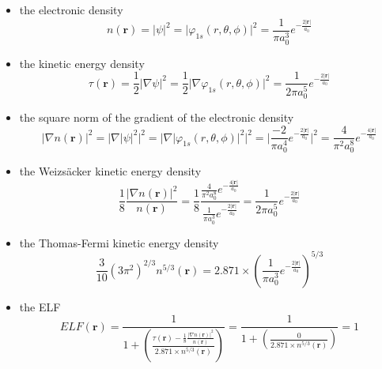 \documentclass[a4paper,12pt]{report}
\begin{document}
\begin{itemize}
\item the electronic density
\begin{equation}
n(\mathbf{r}) = \vert \psi \vert^2 = \vert \varphi_{1s}(r,\theta,\phi) \vert^2 = \frac{1}{\pi a_0^3} e^{-\frac{2\vert \mathbf{r} \vert}{a_0}}
\end{equation}
\item the kinetic energy density
\begin{equation}
\tau(\mathbf{r}) = \frac{1}{2} \vert \nabla \psi \vert^2 = \frac{1}{2} \vert \nabla \varphi_{1s}(r,\theta,\phi) \vert^2 = \frac{1}{2\pi a_0^5} e^{-\frac{2\vert \mathbf{r} \vert}{a_0}} \label{eqtaur}
\end{equation}
\item the square norm of the gradient of the electronic density
\begin{equation}
\vert \nabla n(\mathbf{r}) \vert^2 = \bigl\vert \nabla \vert \psi \vert^2 \bigl\vert^2 = \bigl\vert \nabla \vert \varphi_{1s}(r,\theta,\phi)\vert^2 \bigl\vert^2 = \biggl\vert \frac{-2}{\pi a_0^4} e^{-\frac{2\vert \mathbf{r} \vert}{a_0}} \biggl\vert^2 = \frac{4}{\pi^2 a_0^8} e^{-\frac{4\vert \mathbf{r} \vert}{a_0}}
\end{equation}
\item the Weizs\"{a}cker kinetic energy density
\begin{equation}
\frac{1}{8} \frac{\vert \nabla n(\mathbf{r}) \vert^2}{n(\mathbf{r})} = \frac{1}{8} \frac{ \frac{4}{\pi^2 a_0^8} e^{-\frac{4\vert \mathbf{r}\vert}{a_0}}}{\frac{1}{\pi a_0^3} e^{-\frac{2\vert \mathbf{r} \vert}{a_0}}} = \frac{1}{2\pi a_0^5} e^{-\frac{2\vert \mathbf{r} \vert}{a_0}} \label{eqwtaur}
\end{equation}
\item the Thomas-Fermi kinetic energy density
\begin{equation}
\frac{3}{10} \left(3\pi^2 \right)^{2/3} n^{5/3}(\mathbf{r}) = 2.871 \times \left( \frac{1}{\pi a_0^3} e^{-\frac{2\vert \mathbf{r} \vert}{a_0}}\right)^{5/3}
\end{equation}
\item the ELF
\begin{equation}
ELF(\mathbf{r}) = \frac{1}{1+\left( \frac{\tau(\mathbf{r}) - \frac{1}{8} \frac{\vert \nabla n(\mathbf{r}) \vert^2}{n(\mathbf{r})}}{2.871\times n^{5/3}(\mathbf{r})}\right) } = \frac{1}{1+\left( \frac{0}{2.871\times n^{5/3}(\mathbf{r})}\right) } = 1
\end{equation}
\end{itemize}
\end{document}
